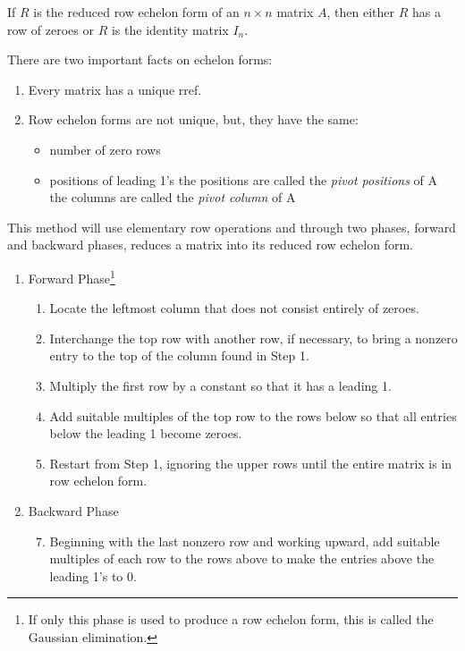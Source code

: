 \documentclass{report}
\begin{document}
		\begin{thm}
			If $R$ is the reduced row echelon form of an $n \times n$ matrix $A$, then either $R$ has a row of zeroes or $R$ is the identity matrix $I_n$.
		\end{thm}
		
		There are two important facts on echelon forms:
		\begin{enumerate}
			\item Every matrix has a unique rref.
			\item Row echelon forms are not unique, but, they have the same:
			\begin{itemize}
				\item number of zero rows
				\item positions of leading 1's
					\subitem the positions are called the \emph{pivot positions} of A
					\subitem the columns are called the \emph{pivot column} of A
			\end{itemize}
		\end{enumerate}
		
		\begin{mthd}\label{mthd_gauss_jordan_elim}
			This method will use elementary row operations and through two phases, forward and backward phases, reduces a matrix into its reduced row echelon form.
			\begin{enumerate}[label=Phase \arabic*.]
				\item Forward Phase\footnote{If only this phase is used to produce a row echelon form, this is called the Gaussian elimination.}
				\begin{enumerate}[label=Step \arabic*.]
					\item Locate the leftmost column that does not consist entirely of zeroes.
					\item Interchange the top row with another row, if necessary, to bring a nonzero entry to the top of the column found in Step 1.
					\item Multiply the first row by a constant so that it has a leading 1.
					\item Add suitable multiples of the top row to the rows below so that all entries below the leading 1 become zeroes.
					\item Restart from Step 1, ignoring the upper rows until the entire matrix is in row echelon form.
				\end{enumerate}
				\item Backward Phase
				\begin{enumerate}[label=Step \arabic*.]
					\setcounter{enumii}{6}
					\item Beginning with the last nonzero row and working upward, add suitable multiples of each row to the rows above to make the entries above the leading 1's to 0.
				\end{enumerate}
			\end{enumerate}
		\end{mthd}
		
\end{document}
